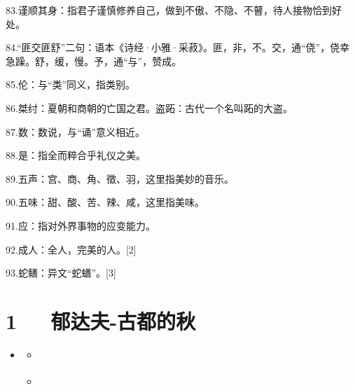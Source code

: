 \documentclass[letterpaper,12pt,english]{sphinxmanual}
\begin{document}
83.谨顺其身：指君子谨慎修养自己，做到不傲、不隐、不瞽，待人接物恰到好处。

84.“匪交匪舒”二句：语本《诗经·小雅·采菽》。匪，非，不。交，通“侥”，侥幸急躁。舒，缓，慢。予，通“与”，赞成。

85.伦：与“类”同义，指类别。

86.桀纣：夏朝和商朝的亡国之君。盗跖：古代一个名叫跖的大盗。

87.数：数说，与“诵”意义相近。

88.是：指全而粹合乎礼仪之美。

89.五声：宫、商、角、徵、羽，这里指美妙的音乐。

90.五味：甜、酸、苦、辣、咸，这里指美味。

91.应：指对外界事物的应变能力。

92.成人：全人，完美的人。{[}2{]}

93.蛇鳝：异文“蛇蟮”。{[}3{]}


\chapter{1   郁达夫-古都的秋}
\label{\detokenize{p01_u6563_u6587/_u90c1_u8fbe_u592b-_u53e4_u90fd_u7684_u79cb:id1}}\label{\detokenize{p01_u6563_u6587/_u90c1_u8fbe_u592b-_u53e4_u90fd_u7684_u79cb::doc}}
\begin{sphinxShadowBox}
\begin{itemize}
\item {} 
\label{\detokenize{p01_u6563_u6587/_u90c1_u8fbe_u592b-_u53e4_u90fd_u7684_u79cb:id5}}{\hyperref[\detokenize{p01_u6563_u6587/_u90c1_u8fbe_u592b-_u53e4_u90fd_u7684_u79cb:id1}]{}}
\begin{itemize}
\item {} 
\label{\detokenize{p01_u6563_u6587/_u90c1_u8fbe_u592b-_u53e4_u90fd_u7684_u79cb:id6}}{\hyperref[\detokenize{p01_u6563_u6587/_u90c1_u8fbe_u592b-_u53e4_u90fd_u7684_u79cb:id3}]{}}

\item {} 
\label{\detokenize{p01_u6563_u6587/_u90c1_u8fbe_u592b-_u53e4_u90fd_u7684_u79cb:id7}}{\hyperref[\detokenize{p01_u6563_u6587/_u90c1_u8fbe_u592b-_u53e4_u90fd_u7684_u79cb:id4}]{}}

\end{itemize}

\end{itemize}
\end{sphinxShadowBox}
\end{document}
